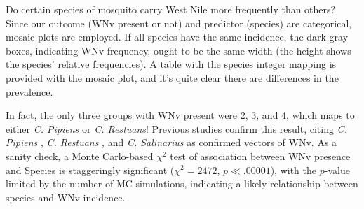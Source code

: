 \documentclass[12pt]{article}
\begin{document}
Do certain species of mosquito carry West Nile more frequently than others? Since our outcome (WNv present or not) and predictor (species) are categorical, mosaic plots are employed. If all species have the same incidence, the dark gray boxes, indicating WNv frequency, ought to be the same width (the height shows the species' relative frequencies). A table with the species integer mapping is provided with the mosaic plot, and it's quite clear there are differences in the prevalence.
\begin{singlespace}
\begin{figure}[H]
\begin{floatrow}
 {\caption*{}}
\end{floatrow}
\end{figure}
\end{singlespace}

In fact, the only three groups with WNv present were 2, 3, and 4, which maps to either \emph{C. Pipiens} or \emph{C. Restuans}! Previous studies confirm this result, citing \emph{C. Pipiens} \cite{turell2001vector}, \emph{C. Restuans} \cite{sardelis2001vector}, and \emph{C. Salinarius} \cite{sardelis2001vector} as confirmed vectors of WNv. As a sanity check, a Monte Carlo-based $\chi^2$ test of association between WNv presence and Species is staggeringly significant ($\chi^2 = 2472$, $p \ll .00001$), with the $p$-value limited by the number of MC simulations, indicating a likely relationship between species and WNv incidence.
\end{document}
